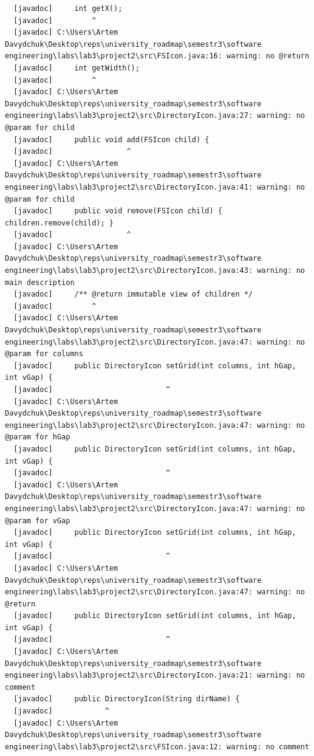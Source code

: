 \documentclass[12pt,a4paper]{article}
\begin{document}
\begin{verbatim}
  [javadoc]     int getX();
  [javadoc]         ^
  [javadoc] C:\Users\Artem Davydchuk\Desktop\reps\university_roadmap\semestr3\software engineering\labs\lab3\project2\src\FSIcon.java:16: warning: no @return
  [javadoc]     int getWidth();
  [javadoc]         ^
  [javadoc] C:\Users\Artem Davydchuk\Desktop\reps\university_roadmap\semestr3\software engineering\labs\lab3\project2\src\DirectoryIcon.java:27: warning: no @param for child
  [javadoc]     public void add(FSIcon child) {
  [javadoc]                 ^
  [javadoc] C:\Users\Artem Davydchuk\Desktop\reps\university_roadmap\semestr3\software engineering\labs\lab3\project2\src\DirectoryIcon.java:41: warning: no @param for child
  [javadoc]     public void remove(FSIcon child) { children.remove(child); }
  [javadoc]                 ^
  [javadoc] C:\Users\Artem Davydchuk\Desktop\reps\university_roadmap\semestr3\software engineering\labs\lab3\project2\src\DirectoryIcon.java:43: warning: no main description
  [javadoc]     /** @return immutable view of children */
  [javadoc]         ^
  [javadoc] C:\Users\Artem Davydchuk\Desktop\reps\university_roadmap\semestr3\software engineering\labs\lab3\project2\src\DirectoryIcon.java:47: warning: no @param for columns
  [javadoc]     public DirectoryIcon setGrid(int columns, int hGap, int vGap) {
  [javadoc]                          ^
  [javadoc] C:\Users\Artem Davydchuk\Desktop\reps\university_roadmap\semestr3\software engineering\labs\lab3\project2\src\DirectoryIcon.java:47: warning: no @param for hGap
  [javadoc]     public DirectoryIcon setGrid(int columns, int hGap, int vGap) {
  [javadoc]                          ^
  [javadoc] C:\Users\Artem Davydchuk\Desktop\reps\university_roadmap\semestr3\software engineering\labs\lab3\project2\src\DirectoryIcon.java:47: warning: no @param for vGap
  [javadoc]     public DirectoryIcon setGrid(int columns, int hGap, int vGap) {
  [javadoc]                          ^
  [javadoc] C:\Users\Artem Davydchuk\Desktop\reps\university_roadmap\semestr3\software engineering\labs\lab3\project2\src\DirectoryIcon.java:47: warning: no @return
  [javadoc]     public DirectoryIcon setGrid(int columns, int hGap, int vGap) {
  [javadoc]                          ^
  [javadoc] C:\Users\Artem Davydchuk\Desktop\reps\university_roadmap\semestr3\software engineering\labs\lab3\project2\src\DirectoryIcon.java:21: warning: no comment
  [javadoc]     public DirectoryIcon(String dirName) {
  [javadoc]            ^
  [javadoc] C:\Users\Artem Davydchuk\Desktop\reps\university_roadmap\semestr3\software engineering\labs\lab3\project2\src\FSIcon.java:12: warning: no comment

\end{verbatim}
\end{document}
